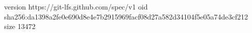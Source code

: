 version https://git-lfs.github.com/spec/v1
oid sha256:da1398a2fe0e690d8e4e7b2915969facf08d27a582d34104f5e05a74de3cf212
size 13472
